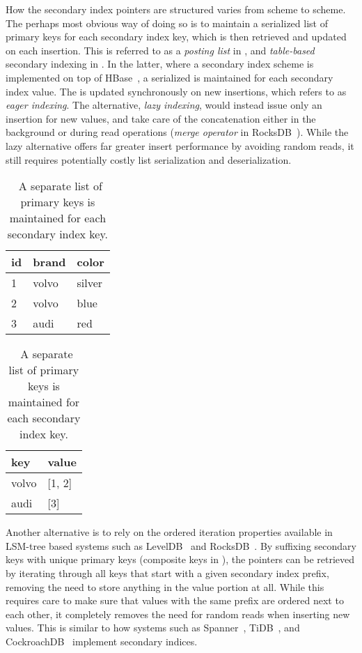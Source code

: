 How the secondary index pointers are structured varies from scheme to scheme.
The perhaps most obvious way of doing so is to maintain a serialized list of
primary keys for each secondary index key, which is then retrieved and updated
on each insertion. This is referred to as a \textit{posting list} in
\cite{lsm-comparison}, and \textit{table-based} secondary indexing in
\cite{hbase-secondary}. In the latter, where a secondary index scheme is
implemented on top of HBase~\cite{hbase}, a serialized  is
maintained for each secondary index value. The  is updated
synchronously on new insertions, which \cite{lsm-comparison} refers to as
\textit{eager indexing}. The alternative, \textit{lazy indexing}, would instead
issue only an insertion for new values, and take care of the concatenation
either in the background or during read operations (\textit{merge operator} in
RocksDB~\cite{rocksdb-merge}). While the lazy alternative offers far greater
insert performance by avoiding random reads, it still requires potentially
costly list serialization and deserialization.

\begin{table}[H]
  \centering
  \begin{tabular}[t]{l l l}
    \toprule
    \textbf{id} & \textbf{brand} & \textbf{color} \\ \midrule
    1 & volvo & silver \\ \midrule
    2 & volvo & blue \\ \midrule
    3 & audi & red \\ \bottomrule
  \end{tabular}
  \quad
  \begin{tabular}[t]{l l}
    \toprule
    \textbf{key} & \textbf{value} \\ \midrule
    volvo & [1, 2] \\ \midrule
    audi & [3] \\ \bottomrule
  \end{tabular}

  \caption{\
    A separate list of primary keys is maintained for each secondary index key.
  }\label{table:secondary-list}
\end{table}

Another alternative is to rely on the ordered iteration properties available in
LSM-tree based systems such as LevelDB~\cite{leveldb-iteration} and
RocksDB~\cite{rocksdb-iteration}. By suffixing secondary keys with unique
primary keys (composite keys in \cite{lsm-comparison}), the pointers can be
retrieved by iterating through all keys that start with a given secondary index
prefix, removing the need to store anything in the value portion at all. While
this requires care to make sure that values with the same prefix are ordered
next to each other, it completely removes the need for random reads when
inserting new values. This is similar to how systems such as
Spanner~\cite{spanner-sql}, TiDB~\cite{tidb-internal}, and
CockroachDB~\cite{cockroach-design} implement secondary indices.

